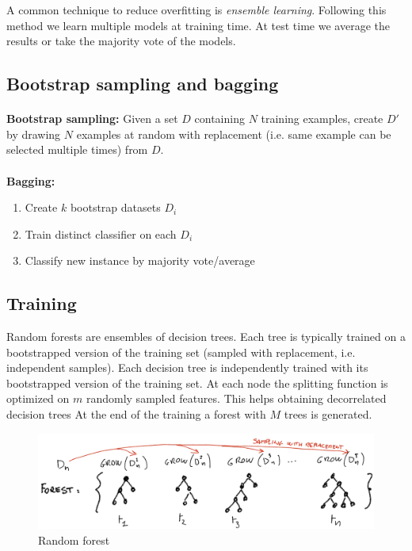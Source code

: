 A common technique to reduce overfitting is \textit{ensemble learning}. Following this method we learn multiple models at training time. At test time we average the results or take the majority vote of the models.

\subsection{Bootstrap sampling and bagging}
\paragraph{}
\textbf{Bootstrap sampling:} Given a set $D$ containing $N$ training examples, create $D'$
by drawing $N$ examples at random with replacement (i.e. same example can be selected multiple times) from $D$.
\paragraph{}
\textbf{Bagging:}
\begin{enumerate}
    \item Create $k$ bootstrap datasets $D_i$
    \item Train distinct classifier on each $D_i$
    \item Classify new instance by majority vote/average
\end{enumerate}

\subsection{Training}
Random forests are ensembles of decision trees. Each tree is typically trained on a bootstrapped version of the training set (sampled
with replacement, i.e. independent samples).
Each decision tree is independently trained with its bootstrapped version of the training set. At each node the splitting function is optimized on $m$ randomly sampled features. This helps obtaining decorrelated decision trees
At the end of the training a forest with $M$ trees is generated.
\begin{figure}
    \centering
    \includegraphics[width=\textwidth]{images/ricci_randomForest.png}
    \caption{Random forest}
    \label{rf}
\end{figure}

